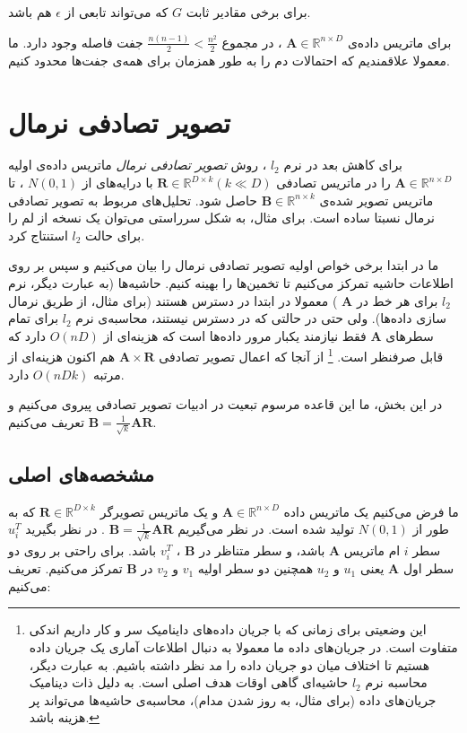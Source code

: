 برای برخی مقادیر ثابت 
$G$
که می‌تواند تابعی از 
$\epsilon$
هم باشد.

برای ماتریس داده‌ی
$\mathbf{A} \in \mathbb{R}^{n \times D}$
، در مجموع 
$\frac{n(n-1)}{2} < \frac{n^2}{2}$
جفت فاصله وجود دارد. ما معمولا علاقمندیم که احتمالات دم را به طور همزمان برای همه‌ی جفت‌ها محدود کنیم. 

\section{
تصویر تصادفی نرمال
\label{SecNormal}
}
برای کاهش بعد در نرم 
$l_2$
، روش 
\textit{
تصویر تصادفی نرمال
}
ماتریس داده‌ی اولیه 
$\mathbf{A} \in \mathbb{R}^{n \times D}$
را در ماتریس تصادفی 
$\mathbf{R} \in \mathbb{R}^{D \times k} (k \ll D)$
با درایه‌های 
از 
$N(0,1)$
، تا ماتریس تصویر شده‌ی 
$\mathbf{B} \in \mathbb{R}^{n \times k}$
حاصل شود. تحلیل‌های مربوط به تصویر تصادفی نرمال نسبتا ساده است. برای مثال، به شکل سرراستی می‌توان یک نسخه از لم 
%
\cite{litez103}
را برای حالت 
$l_2$
استنتاج کرد.

ما در ابتدا برخی خواص اولیه تصویر تصادفی نرمال را بیان می‌کنیم و سپس بر روی اطلاعات حاشیه تمرکز می‌کنیم تا تخمین‌ها را بهینه کنیم. حاشیه‌ها (به عبارت دیگر، نرم 
$l_2$
برای هر خط در 
$\mathbf{A}$
)
معمولا در ابتدا در دسترس هستند (برای مثال، از طریق نرمال سازی داده‌ها). ولی حتی در حالتی که در دسترس نیستند، محاسبه‌ی نرم 
$l_2$
برای تمام سطرهای 
$\mathbf{A}$
فقط نیازمند یکبار مرور داده‌ها است که هزینه‌ای از 
$O(nD)$
دارد که قابل صرفنظر است.
\footnote{
این وضعیتی برای زمانی که با جریان داده‌های داینامیک سر و کار داریم اندکی متفاوت است. در جریان‌های داده ما معمولا به دنبال اطلاعات آماری یک جریان داده هستیم تا اختلاف میان دو جریان داده را مد نظر داشته باشیم. به عبارت دیگر، محاسبه نرم 
$l_2$
حاشیه‌ای گاهی اوقات هدف اصلی است. به دلیل ذات دینامیک جریان‌های داده (برای مثال، به روز شدن مدام)، محاسبه‌ی حاشیه‌ها می‌تواند پر هزینه باشد.
}
از آنجا که اعمال تصویر تصادفی 
$\mathbf{A} \times \mathbf{R}$
هم اکنون هزینه‌ای از مرتبه 
$O(nDk)$
دارد.

در این بخش، ما این قاعده مرسوم تبعیت در ادبیات تصویر تصادفی 
\cite{litez166}
پیروی می‌کنیم و تعریف می‌کنیم
$\mathbf{B} = \frac{1}{\sqrt{k}} \mathbf{A} \mathbf{R}$.

\subsection{
مشخصه‌های اصلی
}

ما فرض می‌کنیم یک ماتریس داده 
$\mathbf{A} \in \mathbb{R}^{n \times D}$
و یک ماتریس تصویرگر
$\mathbf{R} \in \mathbb{R}^{D \times k}$
که به طور 
از 
$N(0,1)$
تولید شده است. در نظر می‌گیریم
$\mathbf{B} = \frac{1}{\sqrt{k}} \mathbf{A} \mathbf{R}$
.
در نظر بگیرید
$u_i^T$
سطر
$i$
ام ماتریس 
$\mathbf{A}$
باشد، و سطر متناظر در 
$\mathbf{B}$
،
$v_i^T$
باشد.
برای راحتی بر روی دو سطر اول 
$\mathbf{A}$
یعنی 
$u_1$
و
$u_2$
همچنین دو سطر اولیه
$v_1$
و 
$v_2$
در 
$\mathbf{B}$
تمرکز می‌کنیم. تعریف می‌کنیم:

